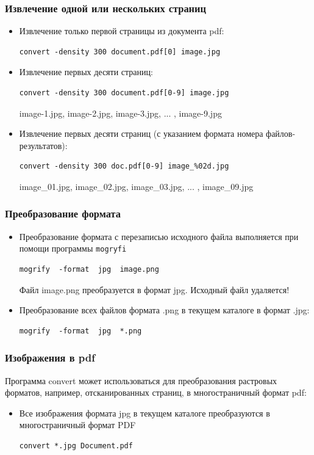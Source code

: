 \documentclass[11pt, compress]{beamer}
\newcommand{\code}[1]{\textcolor{dark-green}{\texttt{#1}}}
\renewcommand{\emph}[1]{\textcolor{dark-blue}{#1}}
\begin{document}
\begin{frame}[c, fragile]
\frametitle{Извлечение одной или нескольких страниц}
\begin{itemize}
\item Извлечение только первой страницы из документа \emph{pdf}:
\begin{lstlisting}
convert -density 300 document.pdf[0] image.jpg
\end{lstlisting}
\item Извлечение первых десяти страниц:
\begin{lstlisting}
convert -density 300 document.pdf[0-9] image.jpg
\end{lstlisting}
image-1.jpg, image-2.jpg, image-3.jpg, ... , image-9.jpg 
\item Извлечение первых десяти страниц (с указанием формата номера файлов-результатов):
\begin{lstlisting}
convert -density 300 doc.pdf[0-9] image_%02d.jpg
\end{lstlisting}
image\_01.jpg, image\_02.jpg, image\_03.jpg, ... , image\_09.jpg 
\end{itemize}
\end{frame}


\begin{frame}[c, fragile]
\frametitle{Преобразование формата}
\begin{itemize}
\item Преобразование формата с перезаписью исходного файла выполняется при помощи программы \code{mogryfi}
\begin{lstlisting}
mogrify  -format  jpg  image.png
\end{lstlisting}  
Файл \emph{image.png} преобразуется в формат \emph{jpg}. \alert{Исходный файл удаляется!}
\item Преобразование всех файлов формата \emph{.png} в текущем каталоге в формат \emph{.jpg}:
\begin{lstlisting}
mogrify  -format  jpg  *.png
\end{lstlisting}  
\end{itemize}
\end{frame}


\begin{frame}[c, fragile]
\frametitle{Изображения в pdf}
Программа \emph{convert} может использоваться для преобразования растровых форматов, например, отсканированных страниц, в многостраничный формат pdf:
\begin{itemize}
\item Все изображения формата jpg  в текущем каталоге преобразуются в многостраничный формат PDF
\begin{lstlisting}
convert *.jpg Document.pdf
\end{lstlisting}
\end{itemize}
\end{frame}
\end{document}
